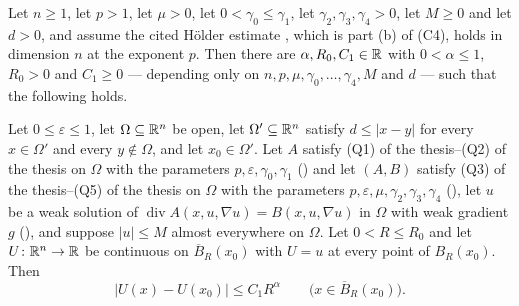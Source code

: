 \begin{lemma}
Let $n\ge1$, let $p>1$, let $\mu>0$, let $0<\gamma_0\le\gamma_1$, let
$\gamma_2,\gamma_3,\gamma_4>0$, let $M\ge0$ and let $d>0$, and assume the cited
H\"older estimate , which is part (b) of
(C4), holds in dimension $n$ at the exponent $p$.  Then there are
$\alpha,R_0,C_1\in\mathbb{R}$ with $0<\alpha\le1$, $R_0>0$ and $C_1\ge0$ --- depending
only on $n,p,\mu,\gamma_0,\dots,\gamma_4,M$ and $d$ --- such that the following
holds.

Let $0\le\varepsilon\le1$, let $\Omega\subseteq\mathbb{R}^n$ be open, let
$\Omega'\subseteq\mathbb{R}^n$ satisfy $d\le|x-y|$ for every $x\in\Omega'$ and every
$y\notin\Omega$, and let $x_0\in\Omega'$.  Let $A$ satisfy
(Q1) of the thesis--(Q2) of the thesis on $\Omega$ with the parameters
$p,\varepsilon,\gamma_0,\gamma_1$ () and let
$(A,B)$ satisfy (Q3) of the thesis--(Q5) of the thesis on $\Omega$ with the parameters
$p,\varepsilon,\mu,\gamma_2,\gamma_3,\gamma_4$
(), let $u$ be a weak solution of
$\operatorname{div}A(x,u,\nabla u)=B(x,u,\nabla u)$ in $\Omega$ with weak
gradient $g$ (), and suppose $|u|\le M$ almost
everywhere on $\Omega$.  Let $0<R\le R_0$ and let $U\colon\mathbb{R}^n\to\mathbb{R}$ be
continuous on $\overline B_R(x_0)$ with $U=u$ at every point of $B_R(x_0)$.
Then
\[
|U(x)-U(x_0)|\le C_1R^{\alpha}\qquad\bigl(x\in\overline B_R(x_0)\bigr).
\]
\end{lemma}
